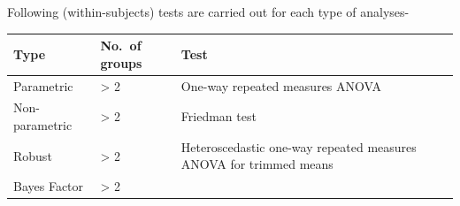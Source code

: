 \documentclass[]{article}
\begin{document}
Following (within-subjects) tests are carried out for each type of analyses-

\begin{longtable}[]{@{}lll@{}}
\toprule
\begin{minipage}[b]{0.26\columnwidth}\raggedright
Type\strut
\end{minipage} & \begin{minipage}[b]{0.07\columnwidth}\raggedright
No.~of groups\strut
\end{minipage} & \begin{minipage}[b]{0.59\columnwidth}\raggedright
Test\strut
\end{minipage}\tabularnewline
\midrule
\endhead
\begin{minipage}[t]{0.26\columnwidth}\raggedright
Parametric\strut
\end{minipage} & \begin{minipage}[t]{0.07\columnwidth}\raggedright
\textgreater{} 2\strut
\end{minipage} & \begin{minipage}[t]{0.59\columnwidth}\raggedright
One-way repeated measures ANOVA\strut
\end{minipage}\tabularnewline
\begin{minipage}[t]{0.26\columnwidth}\raggedright
Non-parametric\strut
\end{minipage} & \begin{minipage}[t]{0.07\columnwidth}\raggedright
\textgreater{} 2\strut
\end{minipage} & \begin{minipage}[t]{0.59\columnwidth}\raggedright
Friedman test\strut
\end{minipage}\tabularnewline
\begin{minipage}[t]{0.26\columnwidth}\raggedright
Robust\strut
\end{minipage} & \begin{minipage}[t]{0.07\columnwidth}\raggedright
\textgreater{} 2\strut
\end{minipage} & \begin{minipage}[t]{0.59\columnwidth}\raggedright
Heteroscedastic one-way repeated measures ANOVA for trimmed means\strut
\end{minipage}\tabularnewline
\begin{minipage}[t]{0.26\columnwidth}\raggedright
Bayes Factor\strut
\end{minipage} & \begin{minipage}[t]{0.07\columnwidth}\raggedright
\textgreater{} 2\strut

\end{minipage}
\end{longtable}
\end{document}
